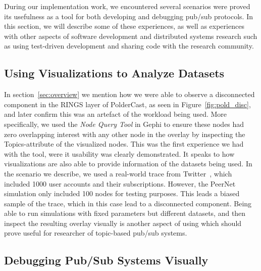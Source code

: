 During our implementation work, we encountered several scenarios were
\demo proved its usefulness as a tool for both developing and debugging
pub/sub protocols. In this section, we will describe some of these
experiences, as well as experiences with other aspects of software
development and distributed systems research such as using test-driven
development and sharing code with the research community.

\subsection{Using Visualizations to Analyze Datasets}

In section~\ref{sec:overview} we mention how we were able to observe a
disconnected component in the RINGS layer of PolderCast, as seen in
Figure~\ref{fig:pold_disc}, and later confirm this was an artefact of
the workload being used. More specifically, we used the \emph{Node Query
    Tool} in Gephi to ensure these nodes had zero overlapping interest
with any other node in the overlay by inspecting the Topics-attribute of
the visualized nodes. This was the first experience we had with the tool, were it
usability was clearly demonstrated. It speaks to how visualizations are
also able to provide information of the datasets being used. In the
scenario we describe, we used a real-world trace from Twitter~\cite{Kwak10www},
which included 1000 user accounts and their subscriptions. However, the
PeerNet simulation only included 100 nodes for testing purposes. This
leads a biased sample of the trace, which in this case lead to a
disconnected component. Being able to run simulations with fixed
parameters but different datasets, and then inspect the resulting
overlay visually is another aspect of using \demo which should prove
useful for researcher of topic-based pub/sub systems.

\subsection{Debugging Pub/Sub Systems Visually}

